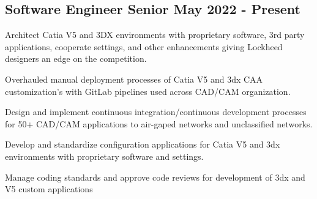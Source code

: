 \subsection{{Software Engineer Senior \hfill May 2022 - Present}}
\begin{zitemize}
	\item Architect Catia V5 and 3DX environments with proprietary software, 3rd party applications, cooperate settings, and other enhancements giving Lockheed designers an edge on the competition. 
	\item Overhauled manual deployment processes of Catia V5 and 3dx CAA customization's with GitLab pipelines used across CAD/CAM organization.  
	\item Design and implement continuous integration/continuous development  processes for 50+ CAD/CAM applications to air-gaped networks and unclassified networks.
	\item Develop and standardize configuration applications for Catia V5 and 3dx environments with proprietary software and settings.
	\item Manage coding standards and approve code reviews for development of 3dx and V5 custom applications\\
\end{zitemize}



